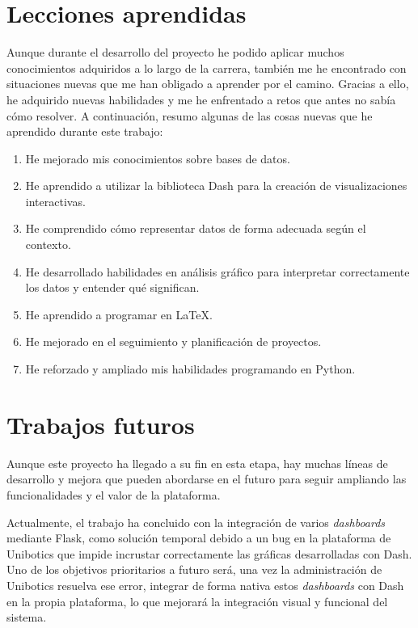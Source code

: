 \documentclass[a4paper, 12pt]{book}
\begin{document}
\section{Lecciones aprendidas}
\label{sec:lecciones_aprendidas}

Aunque durante el desarrollo del proyecto he podido aplicar muchos conocimientos adquiridos a lo largo de la carrera, también me he encontrado con situaciones nuevas que me han obligado a aprender por el camino. Gracias a ello, he adquirido nuevas habilidades y me he enfrentado a retos que antes no sabía cómo resolver. A continuación, resumo algunas de las cosas nuevas que he aprendido durante este trabajo:

\begin{enumerate}
    \item He mejorado mis conocimientos sobre bases de datos.
    \item He aprendido a utilizar la biblioteca Dash para la creación de visualizaciones interactivas.
    \item He comprendido cómo representar datos de forma adecuada según el contexto.
    \item He desarrollado habilidades en análisis gráfico para interpretar correctamente los datos y entender qué significan.
    \item He aprendido a programar en \LaTeX.
    \item He mejorado en el seguimiento y planificación de proyectos.
    \item He reforzado y ampliado mis habilidades programando en Python.
\end{enumerate}


\section{Trabajos futuros}
\label{sec:trabajos_futuros}

Aunque este proyecto ha llegado a su fin en esta etapa, hay muchas líneas de desarrollo y mejora que pueden abordarse en el futuro para seguir ampliando las funcionalidades y el valor de la plataforma.

Actualmente, el trabajo ha concluido con la integración de varios \textit{dashboards}  mediante Flask, como solución temporal debido a un bug en la plataforma de Unibotics que impide incrustar correctamente las gráficas desarrolladas con Dash. Uno de los objetivos prioritarios a futuro será, una vez la administración de Unibotics resuelva ese error, integrar de forma nativa estos \textit{dashboards}  con Dash en la propia plataforma, lo que mejorará la integración visual y funcional del sistema.
\end{document}
